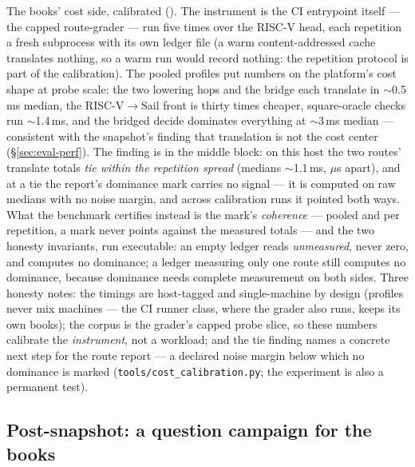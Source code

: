 

The books' cost side, calibrated (). The instrument is
the CI entrypoint itself --- the capped route-grader --- run five
times over the RISC-V head, each repetition a fresh subprocess with
its own ledger file (a warm content-addressed cache translates
nothing, so a warm run would record nothing: the repetition protocol
is part of the calibration). The pooled profiles put numbers on the
platform's cost shape at probe scale: the two lowering hops and the
bridge each translate in $\sim$0.5\,ms median, the
RISC-V$\to$Sail front is thirty times cheaper, square-oracle checks
run $\sim$1.4\,ms, and the bridged decide dominates everything at
$\sim$3\,ms median --- consistent with the snapshot's finding that
translation is not the cost center (\S\ref{sec:eval-perf}). The
finding is in the middle block: on this host the two routes'
translate totals \emph{tie within the repetition spread} (medians
$\sim$1.1\,ms, $\mu$s apart), and at a tie the report's dominance
mark carries no signal --- it is computed on raw medians with no
noise margin, and across calibration runs it pointed both ways.
What the benchmark certifies instead is the mark's \emph{coherence}
--- pooled and per repetition, a mark never points against the
measured totals --- and the two honesty invariants, run executable:
an empty ledger reads \emph{unmeasured}, never zero, and computes no
dominance; a ledger measuring only one route still computes no
dominance, because dominance needs complete measurement on both
sides. Three honesty notes: the timings are host-tagged and
single-machine by design (profiles never mix machines --- the CI
runner class, where the grader also runs, keeps its own books); the
corpus is the grader's capped probe slice, so these numbers calibrate
the \emph{instrument}, not a workload; and the tie finding names a
concrete next step for the route report --- a declared noise margin
below which no dominance is marked
(\texttt{tools/cost\_calibration.py}; the experiment is also a
permanent test).

\subsection{Post-snapshot: a question campaign for the books}
\label{sec:eval-campaign}



